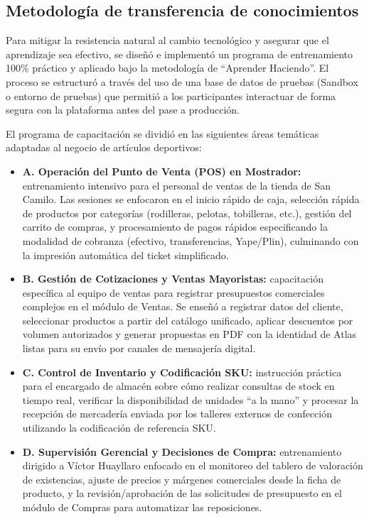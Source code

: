 \subsection{Metodología de transferencia de conocimientos}
\begin{indentedsubsection}
Para mitigar la resistencia natural al cambio tecnológico y asegurar que el aprendizaje sea efectivo, se diseñó e implementó un programa de entrenamiento 100\% práctico y aplicado bajo la metodología de ``Aprender Haciendo''. El proceso se estructuró a través del uso de una base de datos de pruebas (Sandbox o entorno de pruebas) que permitió a los participantes interactuar de forma segura con la plataforma antes del pase a producción.

El programa de capacitación se dividió en las siguientes áreas temáticas adaptadas al negocio de artículos deportivos:

\begin{itemize}
    \item \textbf{A. Operación del Punto de Venta (POS) en Mostrador:} entrenamiento intensivo para el personal de ventas de la tienda de San Camilo. Las sesiones se enfocaron en el inicio rápido de caja, selección rápida de productos por categorías (rodilleras, pelotas, tobilleras, etc.), gestión del carrito de compras, y procesamiento de pagos rápidos especificando la modalidad de cobranza (efectivo, transferencias, Yape/Plin), culminando con la impresión automática del ticket simplificado.
    \item \textbf{B. Gestión de Cotizaciones y Ventas Mayoristas:} capacitación específica al equipo de ventas para registrar presupuestos comerciales complejos en el módulo de Ventas. Se enseñó a registrar datos del cliente, seleccionar productos a partir del catálogo unificado, aplicar descuentos por volumen autorizados y generar propuestas en PDF con la identidad de Atlas listas para su envío por canales de mensajería digital.
    \item \textbf{C. Control de Inventario y Codificación SKU:} instrucción práctica para el encargado de almacén sobre cómo realizar consultas de stock en tiempo real, verificar la disponibilidad de unidades ``a la mano'' y procesar la recepción de mercadería enviada por los talleres externos de confección utilizando la codificación de referencia SKU.
    \item \textbf{D. Supervisión Gerencial y Decisiones de Compra:} entrenamiento dirigido a Víctor Huayllaro enfocado en el monitoreo del tablero de valoración de existencias, ajuste de precios y márgenes comerciales desde la ficha de producto, y la revisión/aprobación de las solicitudes de presupuesto en el módulo de Compras para automatizar las reposiciones.
\end{itemize}
\end{indentedsubsection}
 
